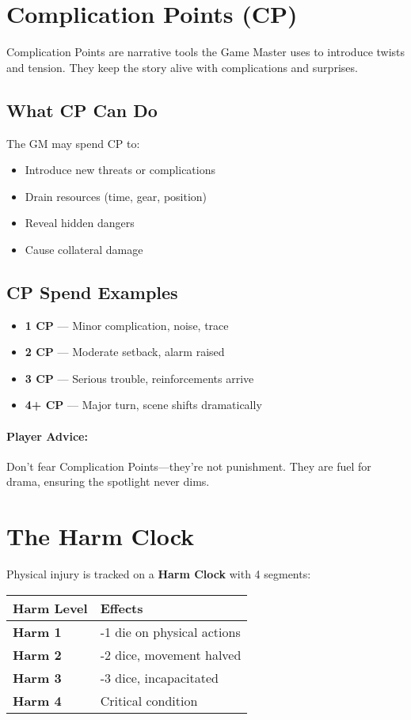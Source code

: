 \begin{multicols}{2}
\section{Complication Points (CP)} 

Complication Points are narrative tools the Game Master uses to introduce twists and tension. They keep the story alive with complications and surprises.

\subsection*{What CP Can Do}
The GM may spend CP to:
\begin{itemize}
  \item Introduce new threats or complications
  \item Drain resources (time, gear, position)
  \item Reveal hidden dangers
  \item Cause collateral damage
\end{itemize}

\subsection*{CP Spend Examples}
\begin{itemize}
  \item \textbf{1 CP} — Minor complication, noise, trace
  \item \textbf{2 CP} — Moderate setback, alarm raised
  \item \textbf{3 CP} — Serious trouble, reinforcements arrive
  \item \textbf{4+ CP} — Major turn, scene shifts dramatically
\end{itemize}

\paragraph{Player Advice:}  
Don’t fear Complication Points—they’re not punishment. They are fuel for drama, ensuring the spotlight never dims.

\section{The Harm Clock} 

Physical injury is tracked on a \textbf{Harm Clock} with 4 segments:

\begin{center}
\small
\begin{tabular}{ll}
\toprule
\textbf{Harm Level} & \textbf{Effects} \\
\midrule
\textbf{Harm 1} & -1 die on physical actions \\
\textbf{Harm 2} & -2 dice, movement halved \\
\textbf{Harm 3} & -3 dice, incapacitated \\
\textbf{Harm 4} & Critical condition \\
\bottomrule
\end{tabular}
\end{center}


\end{multicols}
